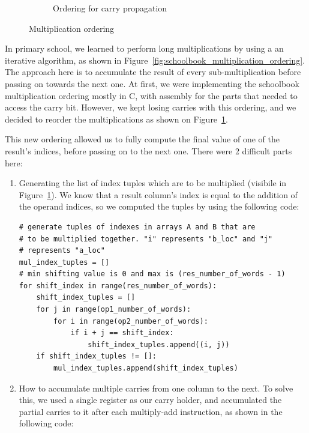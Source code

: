 \documentclass[12pt, a4paper]{report}
\begin{document}
\begin{sloppypar}
\begin{figure}
\begin{subfigure}[h]{0.5\textwidth}
                \caption{Ordering for carry propagation}
                \label{fig:gpu_multiplication_ordering}
        \end{subfigure}
        \caption{Multiplication ordering}\label{fig:multiplication_ordering}
\end{figure}

In primary school, we learned to perform long multiplications by using a
an iterative algorithm, as shown in
Figure~\ref{fig:schoolbook_multiplication_ordering}.
The approach here is to accumulate the result of every sub-multiplication before
passing on towards the next one.
At first, we were implementing the schoolbook multiplication ordering mostly in
C, with assembly for the parts that needed to access the carry bit.
However, we kept losing carries with this ordering, and we decided to reorder the
multiplications as shown on Figure~\ref{fig:gpu_multiplication_ordering}.

This new ordering allowed us to fully compute the final value of one of the
result's indices, before passing on to the next one.
There were 2 difficult parts here:
\begin{enumerate}
\item Generating the list of index tuples which are to be multiplied (visibile in Figure~\ref{fig:gpu_multiplication_ordering}).
We know that a result column's index is equal to the addition of the operand indices, so we computed the tuples by using the following code:

\begin{lstlisting}
# generate tuples of indexes in arrays A and B that are
# to be multiplied together. "i" represents "b_loc" and "j"
# represents "a_loc"
mul_index_tuples = []
# min shifting value is 0 and max is (res_number_of_words - 1)
for shift_index in range(res_number_of_words):
    shift_index_tuples = []
    for j in range(op1_number_of_words):
        for i in range(op2_number_of_words):
            if i + j == shift_index:
                shift_index_tuples.append((i, j))
    if shift_index_tuples != []:
        mul_index_tuples.append(shift_index_tuples)
\end{lstlisting}

\item How to accumulate multiple carries from one column to
the next.
To solve this, we used a single register as our carry holder, and accumulated
the partial carries to it after each multiply-add instruction, as shown in the
following code:


\end{enumerate}
\end{sloppypar}
\end{document}
